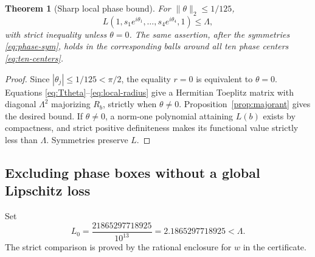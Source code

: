 \documentclass[11pt]{article}
\newtheorem{theorem}{Theorem}[section]
\begin{document}
\begin{theorem}[Sharp local phase bound]\label{thm:local}
For $\|\theta\|_2\le1/125$,
\begin{equation}\label{eq:local-bound}
 L(1,s_1e^{i\theta_1},\ldots,s_4e^{i\theta_4},1)\le\Lambda,
\end{equation}
with strict inequality unless $\theta=0$. The same assertion, after the symmetries \eqref{eq:phase-sym}, holds in the corresponding balls around all ten phase centers \eqref{eq:ten-centers}.
\end{theorem}
\begin{proof}
Since $|\theta_j|\le1/125<\pi/2$, the equality $r=0$ is equivalent to $\theta=0$. Equations \eqref{eq:Ttheta}--\eqref{eq:local-radius} give a Hermitian Toeplitz matrix with diagonal $\Lambda^2$ majorizing $R_b$, strictly when $\theta\ne0$. Proposition~\ref{prop:majorant} gives the desired bound. If
$\theta\ne0$, a norm-one polynomial attaining $L(b)$ exists by
compactness, and strict positive definiteness makes its functional value
strictly less than $\Lambda$. Symmetries preserve $L$.
\end{proof}

\subsection{Excluding phase boxes without a global Lipschitz loss}\label{sec:boxes}

Set
\begin{equation}\label{eq:L0}
 L_0=\frac{21865297718925}{10^{13}}
 =2.1865297718925<\Lambda.
\end{equation}
The strict comparison is proved by the rational enclosure for $w$ in the certificate.
\end{document}
